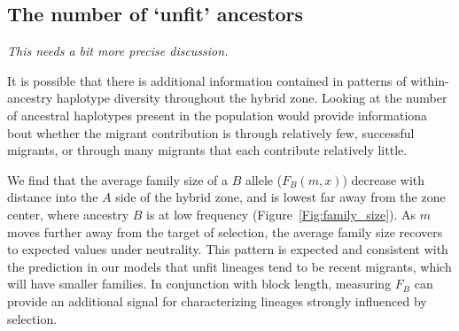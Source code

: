 \documentclass[11pt,letterpaper]{article}
\newcommand{\alisa}[1]{{\em \color{red} #1}}
\newcommand{\plr}[1]{{\em \color{blue} #1}}
\begin{document}
\subsection*{The number of `unfit' ancestors}

\plr{This needs a bit more precise discussion.}

It is possible that there is additional information contained in patterns of within-ancestry haplotype diversity throughout the hybrid zone. Looking at the number of ancestral haplotypes present in the population would provide informationa bout whether the migrant contribution is through relatively few, successful migrants, or through many migrants that each contribute relatively little. 

We find that the average family size of a $B$ allele ($F_B(m,x)$) decrease with distance into the $A$ side of the hybrid zone, and is lowest far away from the zone center, where ancestry $B$ is at low frequency (Figure~\ref{Fig:family_size}). As $m$ moves further away from the target of selection, the average family size recovers to expected values under neutrality. This pattern is expected and consistent with the prediction in our models that unfit lineages tend to be recent migrants, which will have smaller families. In conjunction with block length, measuring $F_B$ can provide an additional signal for characterizing lineages strongly influenced by selection.


\end{document}
